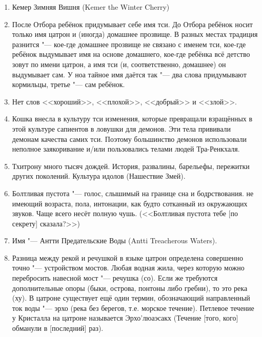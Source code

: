 \documentclass[a4paper,10pt]{book}
\begin{document}
\begin{enumerate}
\item Кемер Зимняя Вишня (Kemer the Winter Cherry)

\item После Отбора ребёнок придумывает себе имя тси. До Отбора ребёнок носит
только имя цатрон и (иногда) домашнее прозвище. В разных местах традиция
разнится "--- кое-где домашнее прозвище не связано с именем тси,
кое-где ребёнок выдумывает имя на основе домашнего, кое-где ребёнка всё детство
зовут по имени цатрон, а имя тси (и, соответственно, домашнее) он выдумывает 
сам.
У ноа тайное имя даётся так "--- два слова придумывают кормильцы,
третье "--- сам ребёнок.

\item Нет слов <<хороший>>, <<плохой>>, <<добрый>> и <<злой>>.

\item Кошка внесла в культуру тси изменения, которые превращали взращённых в 
этой культуре
сапиентов в ловушки для демонов. Эти тела прививали демонам качества самих тси.
Поэтому большинство демонов использовали неполное заякоривание и/или 
пользовались телами
людей Тра-Ренкхаля.

\item Тхитрону много тысяч дождей. История, развалины, барельефы, 
пережитки других поколений. Культура идолов (Нашествие Змей).

\item Болтливая пустота "--- голос, слышимый на границе сна и бодрствования. не 
имеющий возраста, пола, интонации, как будто сотканный из окружающих звуков. 
Чаще всего несёт полную чушь. (<<Болтливая пустота тебе [по секрету] сказала?>>)

\item Имя "--- Антти Предательские Воды (Antti Treacherous Waters).
\item Разница между рекой и речушкой в языке цатрон определена совершенно точно 
"---
устройством мостов. Любая водная жила, через которую можно перебросить навесной
мост "--- речушка (со). Если же требуются дополнительные опоры (быки, острова, 
понтоны либо
гребни), то это река (ху). В цатроне существует ещё один термин, обозначающий 
направленный ток воды
"--- эрхо (река без берегов, т.е. морское течение). Петлевое течение у 
Кристалла на цатроне называется
Эрхо'люаэсакх (Течение [того, кого] обманули в [последний] раз).


\end{enumerate}
\end{document}
